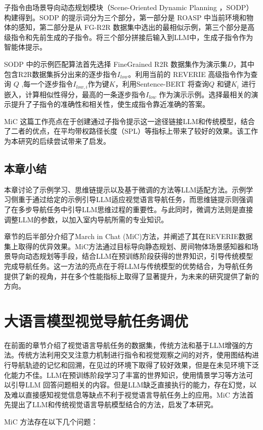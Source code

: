 \documentclass[bachelor]{thesis-uestc}
\begin{document}
子指令由场景导向动态规划模块（Scene-Oriented Dynamic Planning ，SODP）构建得到。SODP 的提示词分为三个部分，第一部分是 ROASP 中当前环境和物体的感知，第二部分是从 FG-R2R 数据集中选出的最相似示例，第三个部分是高级指令和先前生成的子指令。将三个部分拼接后输入到LLM中，生成子指令作为智能体提示。

SODP 中的示例匹配算法首先选择 FineGrained R2R 数据集作为演示集$D$，其中包含R2R数据集拆分出来的逐步指令$I_{low}$。利用当前的 REVERIE 高级指令作为查询 $Q$ ,每一个逐步指令$I_{low,i}$作为键$K$，利用Sentence-BERT 将查询$Q$ 和键$K_i$ 进行嵌入，计算相似性得分，最高的一条逐步指令$I_{low}$ 作为演示示例。选择最相关的演示提升了子指令的准确性和相关性，使生成指令靠近准确的答案。

MiC 这篇工作亮点在于创建通过子指令提示这一途径链接LLM和传统模型，结合了二者的优点，在平均带权路径长度（SPL）等指标上带来了较好的效果。该工作为本研究的后续尝试带来了启发。

\section{本章小结}
本章讨论了示例学习、思维链提示以及基于微调的方法等LLM适配方法。示例学习侧重于通过给定的示例引导LLM适应视觉语言导航任务，而思维链提示则强调了在多步导航任务中引导LLM思维过程的重要性。与此同时，微调方法则是直接调整LLM的参数，以加入室内导航所需的专业知识。

章节的后半部分介绍了March in Chat (MiC)方法，并阐述了其在REVERIE数据集上取得的优异效果。MiC方法通过目标导向静态规划、房间物体场景感知器和场景导向动态规划等手段，结合LLM在预训练阶段获得的世界知识，引导传统模型完成导航任务。这一方法的亮点在于将LLM与传统模型的优势结合，为导航任务提供了新的视角，并在多个性能指标上取得了显著提升，为未来的研究提供了新的方向。

\chapter{大语言模型视觉导航任务调优}

在前面的章节介绍了视觉语言导航任务的数据集，传统方法和基于LLM增强的方法。传统方法利用交叉注意力机制进行指令和视觉观察之间的对齐，使用图结构进行导航轨迹的记忆和回溯，在见过的环境下取得了较好效果，但是在未见环境下泛化能力不佳。LLM在预训练阶段学习了丰富的世界知识，使用情景学习等方法可以引导LLM 回答问题相关的内容。但是LLM缺乏直接执行的能力，存在幻觉，以及难以直接感知视觉信息等缺点不利于视觉语言导航任务上的应用。MiC 方法首先提出了LLM和传统视觉语言导航模型结合的方法，启发了本研究。

MiC 方法存在以下几个问题：
\end{document}
